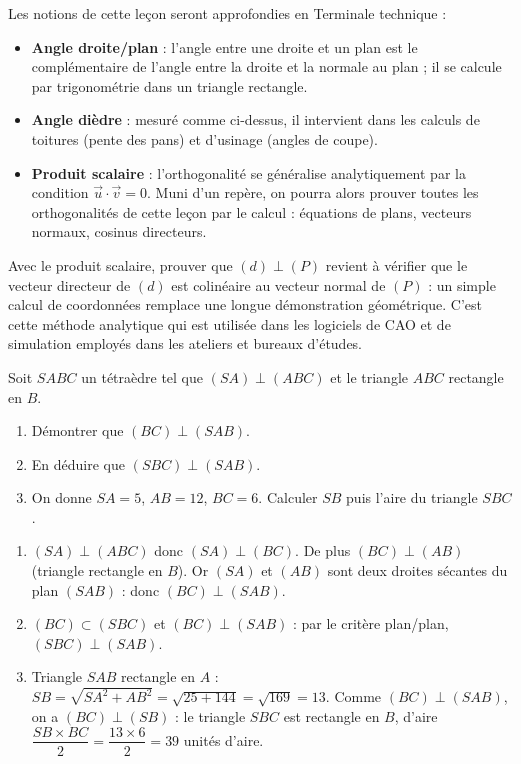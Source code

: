 \documentclass[11pt]{article}
\begin{document}
Les notions de cette leçon seront approfondies en Terminale technique :
\begin{itemize}
\item \textbf{Angle droite/plan} : l'angle entre une droite et un plan est le complémentaire de l'angle entre la droite et la normale au plan ; il se calcule par trigonométrie dans un triangle rectangle.
\item \textbf{Angle dièdre} : mesuré comme ci-dessus, il intervient dans les calculs de toitures (pente des pans) et d'usinage (angles de coupe).
\item \textbf{Produit scalaire} : l'orthogonalité se généralise analytiquement par la condition $\vec{u}\cdot\vec{v}=0$. Muni d'un repère, on pourra alors prouver toutes les orthogonalités de cette leçon par le calcul : équations de plans, vecteurs normaux, cosinus directeurs.
\end{itemize}

\begin{savaistu}
Avec le produit scalaire, prouver que $(d)\perp(P)$ revient à vérifier que le vecteur directeur de $(d)$ est colinéaire au vecteur normal de $(P)$ : un simple calcul de coordonnées remplace une longue démonstration géométrique. C'est cette méthode analytique qui est utilisée dans les logiciels de CAO et de simulation employés dans les ateliers et bureaux d'études.
\end{savaistu}

\begin{exercice}
Soit $SABC$ un tétraèdre tel que $(SA)\perp(ABC)$ et le triangle $ABC$ rectangle en $B$.
\begin{enumerate}
\item Démontrer que $(BC)\perp(SAB)$.
\item En déduire que $(SBC)\perp(SAB)$.
\item On donne $SA=5$, $AB=12$, $BC=6$. Calculer $SB$ puis l'aire du triangle $SBC$.
\end{enumerate}
\end{exercice}

\begin{corrige}[Exercice 1]
\begin{enumerate}
\item $(SA)\perp(ABC)$ donc $(SA)\perp(BC)$. De plus $(BC)\perp(AB)$ (triangle rectangle en $B$). Or $(SA)$ et $(AB)$ sont deux droites sécantes du plan $(SAB)$ : donc $(BC)\perp(SAB)$.
\item $(BC)\subset(SBC)$ et $(BC)\perp(SAB)$ : par le critère plan/plan, $(SBC)\perp(SAB)$.
\item Triangle $SAB$ rectangle en $A$ : $SB=\sqrt{SA^{2}+AB^{2}}=\sqrt{25+144}=\sqrt{169}=13$. Comme $(BC)\perp(SAB)$, on a $(BC)\perp(SB)$ : le triangle $SBC$ est rectangle en $B$, d'aire $\dfrac{SB\times BC}{2}=\dfrac{13\times6}{2}=39$ unités d'aire.
\end{enumerate}
\end{corrige}
\end{document}
